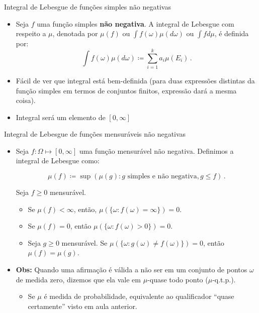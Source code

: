 \documentclass[11pt]{beamer}
\begin{document}
	\begin{frame}{Integral de Lebesgue de funções simples não negativas}
		\begin{itemize}
				\item Seja $f$ uma função simples \textbf{não negativa}. A integral de Lebesgue com respeito a $\mu$, denotada por $\mu(f)$ ou $\int f(\omega) \mu(d\omega)$ ou $\int f d \mu$, é definida por:
			$$\int f(\omega) \mu(d\omega)\coloneqq \sum_{i=1}^k a_i \mu(E_i) \, .$$
			\item Fácil de ver que integral está bem-definida (para duas expressões distintas da função simples em termos de conjuntos finitos, expressão dará a mesma coisa).
			\item Integral será um elemento de $[0,\infty]$
		\end{itemize}
	
	\end{frame}
	
		\begin{frame}{Integral de Lebesgue de funções mensuráveis não negativas}
		\begin{itemize}
			\item Seja $f: \Omega \mapsto [0,\infty]$ uma função mensurável não negativa. Definimos a integral de Lebesgue  como:
			
			$$\mu(f) \coloneqq \sup (\mu(g): g\text{ simples e não negativa}, g \leq f)\, .$$
			
		\begin{lemma}
			Seja $f \geq 0$ mensurável. 
			\begin{itemize}
				\item Se $\mu(f)  < \infty$, então, $\mu(\{\omega: f(\omega) = \infty\}) = 0$.
				\item Se $\mu(f) = 0$, então $\mu(\{\omega: f(\omega) > 0\}) = 0$.
				\item Seja $g \geq 0$ mensurável. Se $\mu(\{\omega: g(\omega)\neq f(\omega)\})=0$, então $\mu(f) = \mu(g)$.
			\end{itemize}
		\end{lemma}
		\vspace{0.1em}
		\item 	\textbf{Obs:} Quando uma afirmação é válida a não ser em um conjunto de pontos $\omega$ de medida zero, dizemos que ela vale em $\mu$-quase todo ponto ($\mu$-q.t.p.).
		\begin{itemize}
			\item Se  $\mu$ é medida de probabilidade, equivalente ao qualificador ``quase certamente'' visto em aula anterior.
		\end{itemize}
		\end{itemize}
	
	\end{frame}
	
\end{document}
